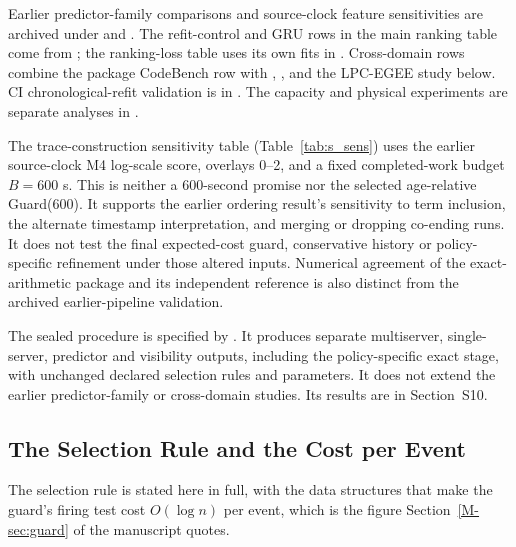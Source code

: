 \documentclass[mathematics,supfile,submit,moreauthors]{Definitions/mdpi}
\newcommand{\devnum}[1]{#1}
\begin{document}
\begin{sloppypar}
Earlier predictor-family comparisons and source-clock feature sensitivities are
archived under  and
. The refit-control and GRU rows in the main
ranking table come from ; the ranking-loss table uses its
own fits in . Cross-domain rows combine the package
CodeBench row with , ,
 and the LPC-EGEE study below. CI chronological-refit
validation is in . The capacity and physical
experiments are separate analyses in .
\end{sloppypar}

The trace-construction sensitivity table (Table~\ref{tab:s_sens})
uses the earlier source-clock M4 log-scale score, overlays
\devnum{0}--\devnum{2}, and a fixed completed-work budget
$B=\devnum{600}$ s. This is neither a \devnum{600}-second promise nor the selected
age-relative Guard(\devnum{600}). It supports the earlier ordering result's
sensitivity to term inclusion, the alternate timestamp interpretation, and
merging or dropping co-ending runs. It does not test the final expected-cost
guard, conservative history or policy-specific refinement under those altered
inputs. Numerical agreement of the exact-arithmetic package and its independent
reference is also distinct from the archived earlier-pipeline validation.

The sealed procedure is specified by . It
produces separate multiserver, single-server, predictor and visibility outputs,
including the policy-specific exact stage, with unchanged declared selection
rules and parameters. It does not extend the earlier predictor-family or
cross-domain studies. Its results are in Section~S10.



\subsection{The Selection Rule and the Cost per Event}
\label{sec:supp_rule}

The selection rule is stated here in full, with the data structures that make the
guard's firing test cost $O(\log n)$ per event, which is the figure Section~\ref*{M-sec:guard} of the
manuscript quotes.
\end{document}
